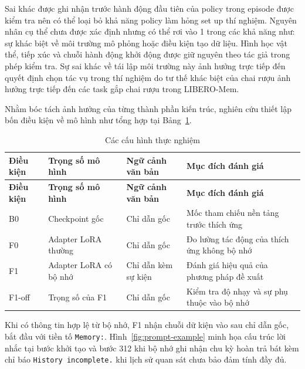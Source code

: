 Sai khác được ghi nhận trước hành động đầu tiên của policy trong episode được kiểm tra nên có thể loại bỏ khả năng policy làm hỏng set up thí nghiệm. Nguyên nhân cụ thể chưa được xác định nhưng có thể rơi vào 1 trong các khả năng như: sự khác biệt về môi trường mô phỏng hoặc điều kiện tạo dữ liệu. Hình học vật thể, tiếp xúc và chuỗi hành động khởi động được giữ nguyên theo tác giả trong phép kiểm tra. Sự sai khác về tái lập môi trường này ảnh hưởng trực tiếp đến quyết định chọn tác vụ trong thí nghiệm do tư thế khác biệt của chai rượu ảnh hưởng trực tiếp đến các task gắp chai rượu trong LIBERO-Mem. 

Nhằm bóc tách ảnh hưởng của từng thành phần kiến trúc, nghiên cứu thiết lập bốn điều kiện về mô hình như tổng hợp tại Bảng~\ref{tab:experimental-conditions}.

\begingroup\small\setlength{\tabcolsep}{4pt}\renewcommand{\arraystretch}{1.15}
\begin{longtable}{>{\raggedright\arraybackslash}p{}|>{\raggedright\arraybackslash}p{}|>{\raggedright\arraybackslash}p{}|>{\raggedright\arraybackslash}p{}}
\caption{Các cấu hình thực nghiệm}\label{tab:experimental-conditions}\\
\toprule
\textbf{Điều kiện} & \textbf{Trọng số mô hình} & \textbf{Ngữ cảnh văn bản} & \textbf{Mục đích đánh giá} \\
\midrule\endfirsthead
\toprule
\textbf{Điều kiện} & \textbf{Trọng số mô hình} & \textbf{Ngữ cảnh văn bản} & \textbf{Mục đích đánh giá} \\
\midrule\endhead
\bottomrule\endfoot
B0 & Checkpoint gốc & Chỉ dẫn gốc & Mốc tham chiếu nền tảng trước thích ứng \\
F0 & Adapter LoRA thường & Chỉ dẫn gốc & Đo lường tác động của thích ứng không bộ nhớ \\
F1 & Adapter LoRA có bộ nhớ & Chỉ dẫn kèm sự kiện & Đánh giá hiệu quả của phương pháp đề xuất \\
F1-off & Trọng số của F1 & Chỉ dẫn gốc & Kiểm tra độ nhạy và sự phụ thuộc vào bộ nhớ \\
\end{longtable}
\endgroup

Khi có thông tin hợp lệ từ bộ nhớ, F1 nhận chuỗi dữ kiện vào sau chỉ dẫn gốc, bắt đầu với tiền tố \texttt{Memory:}. Hình~\ref{fig:prompt-example} minh họa cấu trúc lời nhắc tại bước khởi tạo và bước 312 khi bộ nhớ ghi nhận chu kỳ hoàn trả bát kèm chỉ báo \texttt{History incomplete.} khi lịch sử quan sát chưa bảo đảm tính đầy đủ.


